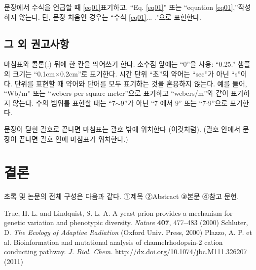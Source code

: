 \documentclass{fullpaper_hutech}
\begin{document}
문장에서 수식을 언급할 때 \eqref{eq01} 표기하고, ``Eq. \eqref{eq01}'' 또는 ``equation \eqref{eq01},''\로 작성하지 않는다. 단, 문장 처음인 경우는 ``수식 \eqref{eq01}\은 ... ."으로 표현한다.


\subsection{그 외 권고사항}

마침표와 콜론(:) 뒤에 한 칸을 띄어쓰기 한다. 소수점 앞에는 ``0''을 사용: ``0.25.'' 샘플의 크기는 ``0.1cm×0.2cm''로 표기한다. 시간 단위 ``초''의 약어는 ``sec''가 아닌 ``s''이다.  단위를 표현할 때 약어와 단어를 모두 표기하는 것을 혼용하지 않는다. 예를 들어, ``Wb/m'' 또는 ``webers per square meter''으로 표기하고 ``webers/m''와 같이 표기하지 않는다. 수의 범위를 표현할 때는 ``7$ \sim $9''가 아닌 ``7 에서 9'' 또는 ``7-9''으로 표기한다.

문장이 닫힌 괄호로 끝나면 마침표는 괄호 밖에 위치한다 (이것처럼). (괄호 안에서 문장이 끝나면 괄호 안에 마침표가 위치한다.)

\section{결론}

초록 및 논문의 전체 구성은 다음과 같다.
①제목 ②Abstract ③본문 ④참고 문헌.

\begin{thebibliography}{99}
 True, H. L. and Lindquist, S. L. A. A yeast prion provides a mechanism for genetic variation and phenotypic diversity. {\it Nature} {\bf 407}, 477--483 (2000)
 Schluter, D. {\it The Ecology of Adaptive Radiation} (Oxford Univ. Press, 2000)
 Plazzo, A. P. et al. Bioinformation and mutational analysis of channelrhodopsin-2 cation conducting pathway. {\it J. Biol. Chem.} http://dx.doi.org/10.1074/jbc.M111.326207 (2011)
\end{thebibliography}
\end{document}
